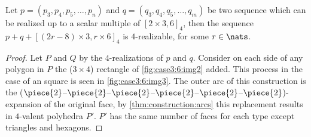 \begin{lemma}
  Let $p = (p_3, p_4, p_5, \dots, p_n)$ and $q = (q_3, q_4, q_5, \dots, q_m)$ be two sequence which can be realized up to a scalar multiple of $[2 \times 3, 6]_4$, then the sequence $p + q + [(2r - 8) \times 3, r \times 6]_4 $ is $4$-realizable, for some $r \in \nats$. 
  \begin{proof}
    Let $P$ and $Q$ by the $4$-realizations of $p$ and $q$. Consider on each side of any polygon in $P$ the ($3 \times 4$) rectangle of \autoref{fig:case3:6:img2} added. This process in the case of an square is seen in \autoref{fig:case3:6:img3}. The outer arc of this construction is the ($\piece{2}$--$\piece{2}$--$\piece{2}$--$\piece{2}$--$\piece{2}$--$\piece{2}$)-expansion of the original face, by \autoref{thm:construction:arcs} this replacement results in $4$-valent polyhedra $P'$. $P'$ has the same number of faces for each type except triangles and hexagons.
    

\end{proof}
\end{lemma}
